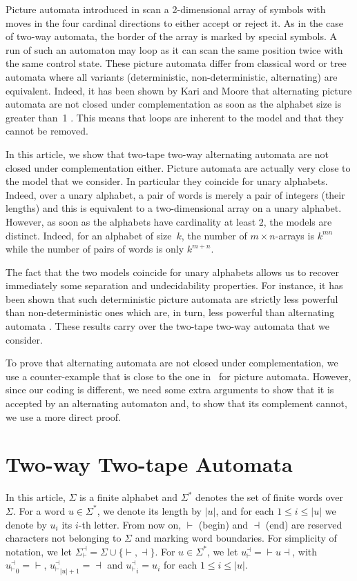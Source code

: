 \documentclass[runningheads, envcountsame, a4paper]{llncs}
\newcommand*{\size}[1]{\left| #1 \right|}
\newcommand*{\bmark}{\vdash}
\newcommand*{\emark}{\dashv}
\newcommand*{\alphabet}{\Sigma}
\newcommand*{\markers}{\{\bmark, \emark\}}
\newcommand*{\addbounds}[1]{{#1}^\emark_\bmark}
\newcommand*{\ealph}{\addbounds{\alphabet}}
\newcommand*{\eword}[1]{{#1}^\emark_\bmark}
\newcommand*{\wordsof}[1]{{#1}^*}
\newcommand*{\words}{\wordsof{\alphabet}}
\begin{document}
Picture automata introduced in \cite{BlumHewitt67} scan a 2-dimensional
array of symbols with moves in the four cardinal directions to either
accept or reject it.  As in the case of two-way automata, the border of the
array is marked by special symbols. A run of such an automaton may loop as
it can scan the same position twice with the same control state.  These
picture automata differ from classical word or tree automata where all
variants (deterministic, non-deterministic, alternating) are equivalent.
Indeed, it has been shown by Kari and Moore that alternating picture
automata are not closed under complementation as soon as the alphabet size
is greater than~1 \cite{KariMoore01}.  This means that loops are inherent
to the model and that they cannot be removed.

In this article, we show that two-tape two-way alternating automata are not
closed under complementation either.  Picture automata are actually very
close to the model that we consider.  In particular they coincide for unary
alphabets.  Indeed, over a unary alphabet, a pair of words is merely a pair
of integers (their lengths) and this is equivalent to a two-dimensional
array on a unary alphabet.  However, as soon as the alphabets have
cardinality at least $2$, the models are distinct.  Indeed, for an alphabet
of size~$k$, the number of $m \times n$-arrays is $k^{mn}$ while the number
of pairs of words is only $k^{m+n}$.

The fact that the two models coincide for unary alphabets allows us to
recover immediately some separation and undecidability properties.  For
instance, it has been shown that such deterministic picture automata are
strictly less powerful than non-deterministic ones which are, in turn, less
powerful than alternating automata \cite{KariMoore01}. These results carry
over the two-tape two-way automata that we consider.

To prove that alternating automata are not closed under complementation, we
use a counter-example that is close to the one in~\cite{KariMoore04} for
picture automata. However, since our coding is different, we need some
extra arguments to show that it is accepted by an alternating automaton
and, to show that its complement cannot, we use a more direct proof.


\section{Two-way Two-tape Automata}

In this article, $\alphabet$ is a finite alphabet and $\words$ denotes the
set of finite words over $\alphabet$. For a word $u \in \words$, we denote
its length by $\size{u}$, and for each $1\leq i\leq \size{u}$ we denote by
$u_i$ its $i$-th letter. From now on, $\bmark$ (begin) and $\emark$ (end)
are reserved characters not belonging to $\alphabet$ and marking word
boundaries. For simplicity of notation, we let $\ealph = \alphabet \cup
\markers$.  For $u \in \words$, we let $\eword{u} = {\bmark}u{\emark}$,
with ${\eword{u}}_0 = {\bmark}$, ${\eword{u}}_{\size{u}+1} = {\emark}$ and
${\eword{u}}_i = u_i$ for each $1 \leq i \leq \size{u}$.
\end{document}
